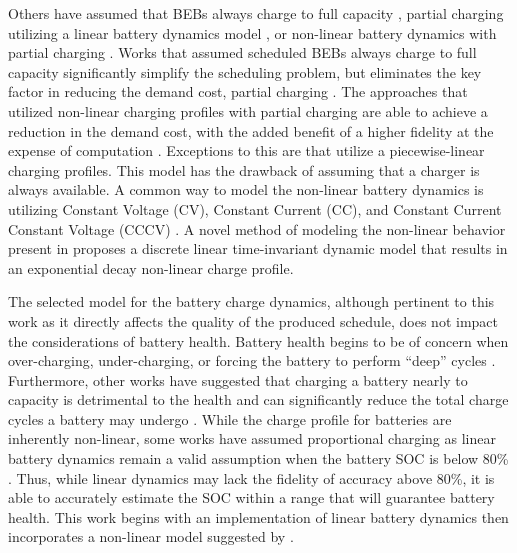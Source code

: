 \documentclass[ee,thesis]{usuthesis}
\begin{document}
Others have assumed that BEBs always charge to full capacity \cite{duan-2021-refor-mixed,zhang-2021-optim-elect,zhou-2020-bi-objec,wang-2017-elect-vehic}, partial charging utilizing a linear battery dynamics model
\cite{wei-2018-optim-spatio,he-2020-optim-charg,mortensen-2023-cost-minim}, or non-linear battery dynamics with
partial charging \cite{whitaker-2023-a-network,zhang-2021-optim-elect,qin-2016-numer-analy,jahic-2019-preem,frendo-2021-open-sourc}. Works that assumed scheduled BEBs always charge to full capacity significantly simplify the
scheduling problem, but eliminates the key factor in reducing the demand cost, partial charging
\cite{tang-2019-robus-sched,duan-2021-refor-mixed,rinaldi-2020-mixed-fleet,zhou-2020-collab-optim}. The
approaches that utilized non-linear charging profiles with partial charging are able to achieve a reduction in the
demand cost, with the added benefit of a higher fidelity at the expense of computation \cite{zhang-2021-optim-elect}.
Exceptions to this are \cite{he-2020-optim-charg} that utilize a piecewise-linear charging profiles. This model has the
drawback of assuming that a charger is always available. A common way to model the non-linear battery dynamics is
utilizing Constant Voltage (CV), Constant Current (CC), and Constant Current Constant Voltage (CCCV)
\cite{abdollahi-2016-optim-batter,chen-2008-desig-grey}. A novel method of modeling the non-linear behavior present
in \cite{whitaker-2023-a-network} proposes a discrete linear time-invariant dynamic model that results in an
exponential decay non-linear charge profile.

The selected model for the battery charge dynamics, although pertinent to this work as it directly affects the quality
of the produced schedule, does not impact the considerations of battery health. Battery health begins to be of concern
when over-charging, under-charging, or forcing the battery to perform ``deep'' cycles \cite{zhou-2020-bi-objec,millner-2010-model-lithium,edge-2021-lithium}. Furthermore, other works have suggested that charging a battery nearly
to capacity is detrimental to the health and can significantly reduce the total charge cycles a battery may undergo
\cite{edge-2021-lithium,millner-2010-model-lithium}. While the charge profile for batteries are inherently
non-linear, some works have assumed proportional charging as linear battery dynamics remain a valid assumption when the
battery SOC is below 80\% \cite{liu-2020-batter-elect}. Thus, while linear dynamics may lack the fidelity of accuracy
above 80\%, it is able to accurately estimate the SOC within a range that will guarantee battery health. This work
begins with an implementation of linear battery dynamics then incorporates a non-linear model suggested by \cite{whitaker-2023-a-network}.
\end{document}
